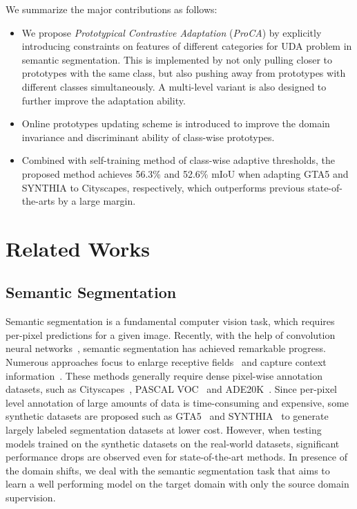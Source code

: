 \documentclass[runningheads]{llncs}
\begin{document}
We summarize the major contributions as follows:
\begin{itemize}
\item We propose {\em Prototypical Contrastive Adaptation} (\textit{ProCA}) by explicitly introducing constraints on features of different categories for UDA problem in semantic segmentation. This is implemented by not only pulling closer to prototypes with the same class, but also pushing away from prototypes with different classes simultaneously. A multi-level variant is also designed to further improve the adaptation ability.

\item Online prototypes updating scheme is introduced to improve the domain invariance and discriminant ability of class-wise prototypes. 

\item Combined with self-training method of class-wise adaptive thresholds, the proposed method achieves 56.3\% and 52.6\% mIoU when adapting GTA5 and SYNTHIA to Cityscapes, respectively, which outperforms previous state-of-the-arts by a large margin.
\end{itemize} \section{Related Works}

\subsection{Semantic Segmentation}
Semantic segmentation is a fundamental computer vision task, which requires per-pixel predictions for a given image. Recently, with the help of convolution neural networks~\cite{long2015fully}, semantic segmentation has achieved remarkable progress. Numerous approaches focus to enlarge receptive fields~\cite{chen2017deeplab} and capture context information~\cite{zhao2017pyramid}. These methods generally require dense pixel-wise annotation datasets, such as Cityscapes~\cite{cordts2016cityscapes}, PASCAL VOC~\cite{everingham2010pascal} and ADE20K~\cite{zhou2017scene}. Since per-pixel level annotation of large amounts of data is time-consuming and expensive, some synthetic datasets are proposed such as GTA5~\cite{richter2016playing} and SYNTHIA~\cite{ros2016synthia} to generate largely labeled segmentation datasets at lower cost. However, when testing models trained on the synthetic datasets on the real-world datasets, significant performance drops are observed even for state-of-the-art methods. In presence of the domain shifts, we deal with the semantic segmentation task that aims to learn a well performing model on the target domain with only the source domain supervision.
\end{document}
